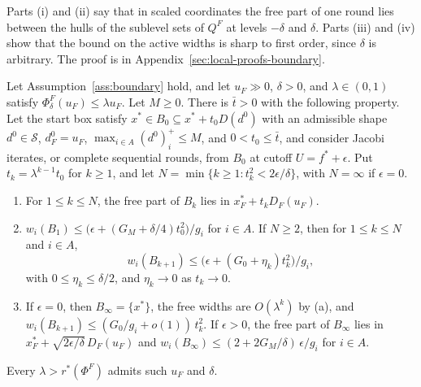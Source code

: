 Parts (i) and (ii) say that in scaled coordinates the free part of one
round lies between the hulls of the sublevel sets of $Q^F$ at levels
$-\delta$ and $\delta$. Parts (iii) and (iv) show that the bound on the active
widths is sharp to first order, since $\delta$ is arbitrary. The proof is
in Appendix~\ref{sec:local-proofs-boundary}.

\begin{theorem}\label{thm:boundary}
Let Assumption~\ref{ass:boundary} hold, and let $u_F\gg0$, $\delta>0$, and
$\lambda\in(0,1)$ satisfy $\Phi^F_\delta(u_F)\le\lambda u_F$. Let $M\ge0$.
There is $\bar t>0$ with the following property. Let the start box satisfy
$x^*\in B_0\subseteq x^*+t_0D(d^0)$ with an admissible shape
$d^0\in\mathcal S$, $d^0_F=u_F$, $\max_{i\in A}(d^0)_i^+\le M$, and
$0<t_0\le\bar t$, and consider Jacobi iterates, or complete sequential
rounds, from $B_0$ at cutoff $U=f^*+\epsilon$. Put $t_k=\lambda^{k-1}t_0$ for $k\ge1$, and let
$N=\min\{k\ge1:t_k^2<2\epsilon/\delta\}$, with $N=\infty$ if $\epsilon=0$.
\begin{enumerate}[label=(\alph*)]
\item For $1\le k\le N$, the free part of $B_k$ lies in
  $x_F^*+t_kD_F(u_F)$.
\item $w_i(B_1)\le\bigl(\epsilon+(G_M+\delta/4)t_0^2\bigr)/g_i$ for $i\in A$. If
  $N\ge2$, then for $1\le k\le N$ and $i\in A$,
  \[
    w_i(B_{k+1})\le\bigl(\epsilon+(G_0+\eta_k)t_k^2\bigr)/g_i,
  \]
  with $0\le\eta_k\le\delta/2$, and $\eta_k\to0$ as $t_k\to0$.
\item If $\epsilon=0$, then $B_\infty=\{x^*\}$, the free widths are
  $O(\lambda^k)$ by (a), and $w_i(B_{k+1})\le(G_0/g_i+o(1))\,t_k^2$. If $\epsilon>0$, the free part of
  $B_\infty$ lies in $x_F^*+\sqrt{2\epsilon/\delta}\,D_F(u_F)$ and
  $w_i(B_\infty)\le(2+2G_M/\delta)\,\epsilon/g_i$ for $i\in A$.
\end{enumerate}
Every $\lambda>r^*(\Phi^F)$ admits such $u_F$ and $\delta$.
\end{theorem}

